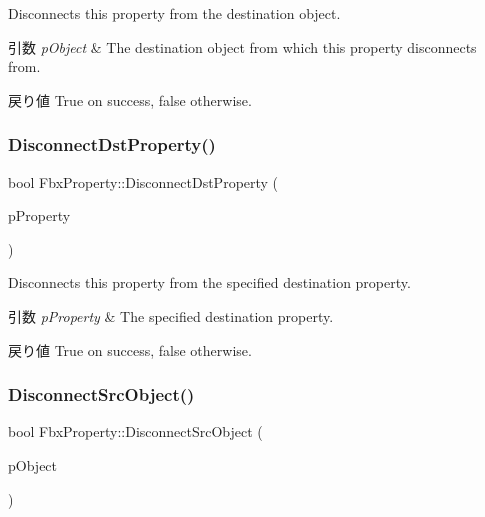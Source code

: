 Disconnects this property from the destination object. 
\begin{DoxyParams}{引数}
{\em p\+Object} & The destination object from which this property disconnects from. \\
\hline
\end{DoxyParams}
\begin{DoxyReturn}{戻り値}
{\ttfamily True} on success, {\ttfamily false} otherwise. 
\end{DoxyReturn}
\mbox{\label{class_fbx_property_aa7178fdcef5b430fd74b5a1385b18ce7}} 
\subsubsection{\texorpdfstring{Disconnect\+Dst\+Property()}{DisconnectDstProperty()}}
{\footnotesize\ttfamily bool Fbx\+Property\+::\+Disconnect\+Dst\+Property (\begin{DoxyParamCaption}\item[{const \hyperlink{class_fbx_property}{Fbx\+Property} \&}]{p\+Property }\end{DoxyParamCaption})}

Disconnects this property from the specified destination property. 
\begin{DoxyParams}{引数}
{\em p\+Property} & The specified destination property. \\
\hline
\end{DoxyParams}
\begin{DoxyReturn}{戻り値}
{\ttfamily True} on success, {\ttfamily false} otherwise. 
\end{DoxyReturn}
\mbox{\label{class_fbx_property_aaf72d2b89f03e122cea736ca8e060cab}} 
\subsubsection{\texorpdfstring{Disconnect\+Src\+Object()}{DisconnectSrcObject()}}
{\footnotesize\ttfamily bool Fbx\+Property\+::\+Disconnect\+Src\+Object (\begin{DoxyParamCaption}\item[{\hyperlink{class_fbx_object}{Fbx\+Object} $\ast$}]{p\+Object }\end{DoxyParamCaption})}


